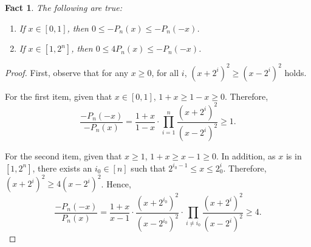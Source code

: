 \documentclass{article}
\newtheorem{fact}[theorem]{Fact}
\begin{document}
\begin{fact}
The following are true:
\begin{enumerate}
\item If $x \in [0,1]$, then $0 \leq -P_n(x) \leq -P_n(-x)$. \label{item:x-small}
\item If $x \in [1, 2^n]$, then $0 \leq 4P_n(x) \leq -P_n(-x)$. \label{item:x-large}
\end{enumerate}
\label{fact:pn}
\end{fact}
\begin{proof}
First, observe that for any $x \geq 0$, for all $i$, $(x+2^i)^2 \geq (x - 2^i)^2$ holds.

For the first item, given that $x \in [0,1]$, $1+x \geq 1-x \geq 0$. Therefore,
\[ \frac{-P_n(-x)}{-P_n(x)} = \frac{1+x}{1-x} \cdot \prod_{i =1}^n \frac{(x+2^i)^2}{(x - 2^i)^2}  \geq 1. \]

For the second item, given that $x \geq 1$, $1+x \geq x-1 \geq 0$. In addition, as $x$ is in $[1,2^n]$, there exists an $i_0 \in [n]$ such that $2^{i_0-1} \leq x \leq 2^i_0$. Therefore,
$(x+2^i)^2 \geq 4(x - 2^i)^2$. Hence,
\[ \frac{-P_n(-x)}{P_n(x)} = \frac{1+x}{ x-1} \cdot \frac{(x+2^{i_0})^2}{(x - 2^{i_0})^2} \cdot \prod_{i \neq i_0} \frac{(x+2^i)^2}{(x - 2^i)^2} \geq 4. \]
\end{proof}
\end{document}
